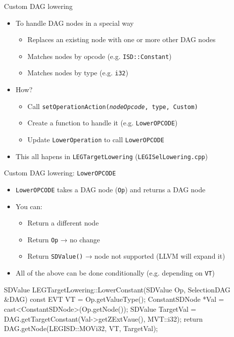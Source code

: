 \begin{frame}[fragile]{Custom DAG lowering}

\begin{itemize}
    \item To handle DAG nodes in a special way
    \begin{itemize}
        \item Replaces an existing node with one or more other DAG nodes
        \item Matches nodes by opcode (e.g. \texttt{ISD::Constant})
        \item Matches nodes by type (e.g. \texttt{i32})
    \end{itemize}
    \item How?
    \begin{itemize}
        \item Call \texttt{setOperationAction(\emph{nodeOpcode}, type, Custom)}
        \item Create a function to handle it (e.g. \texttt{LowerOPCODE})
        \item Update \texttt{LowerOperation} to call \texttt{LowerOPCODE}
    \end{itemize}
    \item This all hapens in \texttt{LEGTargetLowering} (\texttt{LEGISelLowering.cpp})
\end{itemize}

\end{frame}


\begin{frame}[fragile]{Custom DAG lowering: \texttt{LowerOPCODE}}

\begin{itemize}
    \item \texttt{LowerOPCODE} takes a DAG node (\texttt{Op}) and returns a DAG node
    \item You can:
    \begin{itemize}
        \item Return a different node
        \item Return \texttt{Op} → no change
        \item Return \texttt{SDValue()} → node not supported (LLVM will expand it)
    \end{itemize}
    \item All of the above can be done conditionally (e.g. depending on \texttt{VT})
\end{itemize}

\begin{codebox}
SDValue LEGTargetLowering::LowerConstant(SDValue Op,
                                         SelectionDAG &DAG) const {
  EVT VT = Op.getValueType();
  ConstantSDNode *Val = cast<ConstantSDNode>(Op.getNode());
  SDValue TargetVal = DAG.getTargetConstant(Val->getZExtVaue(),
                                            MVT::i32);
  return DAG.getNode(LEGISD::MOVi32, VT, TargetVal);
}
\end{codebox}

\end{frame}

